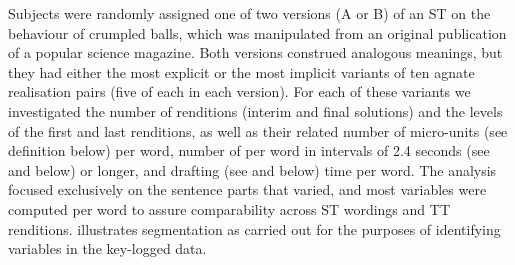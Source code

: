 \documentclass[output=paper]{LSP/langsci}
\begin{document}
Subjects were randomly assigned one of two versions (A or B) of an ST on the behaviour of crumpled balls, which was manipulated from an original publication of a popular science magazine. Both versions construed analogous meanings, but they had either the most explicit or the most implicit variants of ten agnate realisation pairs (five of each in each version). For each of these variants we investigated the number of renditions (interim and final solutions) and the  levels of the first and last renditions, as well as their related number of micro-units (see definition below) per word, number of  per word in intervals of 2.4 seconds (see \citealt{Jakobsen2005Instances} and below) or longer, and drafting (see \citealt{Jakobsen2002Translation} and below) time per word. The analysis focused exclusively on the sentence parts that varied, and most variables were computed per word to assure comparability across ST wordings and TT renditions.  illustrates segmentation as carried out for the purposes of identifying variables in the key-logged data.
\end{document}

